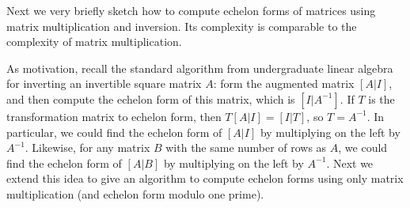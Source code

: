 

Next we very briefly sketch how to compute echelon forms of matrices using matrix
multiplication and inversion.  Its complexity is comparable
to the complexity of matrix multiplication. 

As motivation, recall the standard algorithm from undergraduate linear
algebra for inverting an invertible square matrix $A$: form the
augmented matrix $[A|I]$, and then compute the echelon form of this
matrix, which is $[I|A^{-1}]$. If $T$ is the transformation matrix to
echelon form, then $T[A|I] = [I|T]$, so $T=A^{-1}$.  In particular, we
could find the echelon form of $[A|I]$ by multiplying on the left by
$A^{-1}$.  Likewise, for any matrix $B$ with the same number of rows
as $A$, we could find the echelon form of $[A|B]$ by multiplying on
the left by $A^{-1}$. Next we extend this idea to give
an algorithm to compute echelon forms using only matrix multiplication (and
echelon form modulo one prime).

